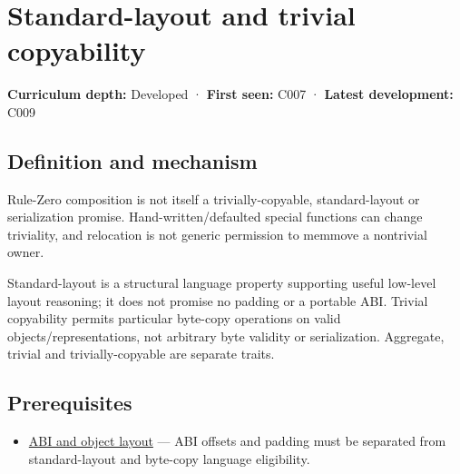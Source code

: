 \hypertarget{appendix-958870a64c53}{}\label{referencestart:appendix-958870a64c53}
\section{Standard-layout and trivial copyability}\label{appendix-958870a64c53-standard-layout-and-trivial-copyability}

\hypertarget{appendix-958870a64c53-standard-layout-and-trivial-copyability}{}

\textbf{Curriculum depth:} Developed · \textbf{First seen:} C007 · \textbf{Latest development:} C009

\begin{allmightroledefinition}

\subsection{Definition and mechanism}\label{appendix-958870a64c53-definition-and-mechanism}

\hypertarget{appendix-958870a64c53-definition-and-mechanism}{}

Rule-Zero composition is not itself a trivially-copyable, standard-layout or serialization promise. Hand-written/defaulted special functions can change triviality, and relocation is not generic permission to memmove a nontrivial owner.

\end{allmightroledefinition}

Standard-layout is a structural language property supporting useful low-level layout reasoning; it does not promise no padding or a portable ABI. Trivial copyability permits particular byte-copy operations on valid objects/representations, not arbitrary byte validity or serialization. Aggregate, trivial and trivially-copyable are separate traits.

\subsection{Prerequisites}\label{appendix-958870a64c53-prerequisites}

\hypertarget{appendix-958870a64c53-prerequisites}{}

\begin{itemize}
\tightlist
\item
  \hyperref[appendix-c4ac6bb0fff8]{ABI and object layout} --- ABI offsets and padding must be separated from standard-layout and byte-copy language eligibility.
\end{itemize}

